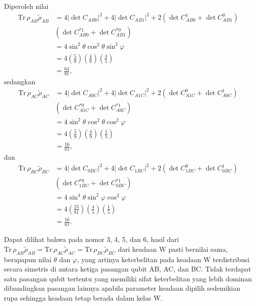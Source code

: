 Diperoleh nilai
\begin{equation}
	\begin{aligned}
		\mathrm{Tr}\,\rho_{AB}\tilde{\rho}_{AB}
		&=4 |\det C_{AB0}|^2+ 4 |\det C_{AB1}|^2+ 2 (\det C_{AB0}^1 + \det C_{AB1}^0)\\
		&(\det C^{*1}_{AB0} + \det C^{*0}_{AB1})\\
		&=4\sin^2\theta \cos^2\theta \sin^2\varphi\\
		&=4(\frac{5}{9})(\frac{4}{9})(\frac{4}{5})\\
		&=\frac{64}{81},
	\end{aligned}
\end{equation}
sedangkan
\begin{equation}
	\begin{aligned}
		\mathrm{Tr}\,\rho_{AC}\tilde{\rho}_{AC}
		&=4|\det C_{A0C}|^2+4|\det C_{A1C}|^2+2(\det C_{A1C}^0+ \det C_{A0C}^1)\\
		&(\det C^{*0}_{A1C} + \det C^{*1}_{A0C})\\
		&=4\sin^2\theta \cos^2\theta \cos^2\varphi\\
		&=4(\frac{5}{9})(\frac{4}{9})(\frac{1}{5})\\
		&=\frac{16}{81},
	\end{aligned}
\end{equation}
dan
\begin{equation}
	\begin{aligned}
		\mathrm{Tr}\,\rho_{BC}\tilde{\rho}_{BC}
		&=4|\det C_{0BC}|^2+4|\det C_{1BC}|^2+2(\det C_{1BC}^0+ \det C_{0BC}^1)\\
		&(\det C^{*0}_{1BC} + \det C^{*1}_{0BC})\\
		&=4\sin^4\theta \sin^2\varphi\cos^2\varphi\\
		&=4(\frac{25}{81})(\frac{4}{5})(\frac{1}{5})\\
		&=\frac{16}{81}.
	\end{aligned}
\end{equation}
\par
Dapat dilihat bahwa pada nomor 3, 4, 5, dan 6, hasil dari $\mathrm{Tr}\,\rho_{AB}\tilde{\rho}_{AB}=\mathrm{Tr}\,\rho_{AC}\tilde{\rho}_{AC}=\mathrm{Tr}\,\rho_{BC}\tilde{\rho}_{BC}$ dari keadaan W pasti bernilai sama, berapapun nilai $\theta$ dan $\varphi$, yang artinya keterbelitan pada keadaan W terdistribusi secara simetris di antara ketiga pasangan qubit AB, AC, dan BC. Tidak terdapat satu pasangan qubit tertentu yang memiliki sifat keterbelitan yang lebih dominan dibandingkan pasangan lainnya apabila parameter keadaan dipilih sedemikian rupa sehingga keadaan tetap berada dalam kelas W.

